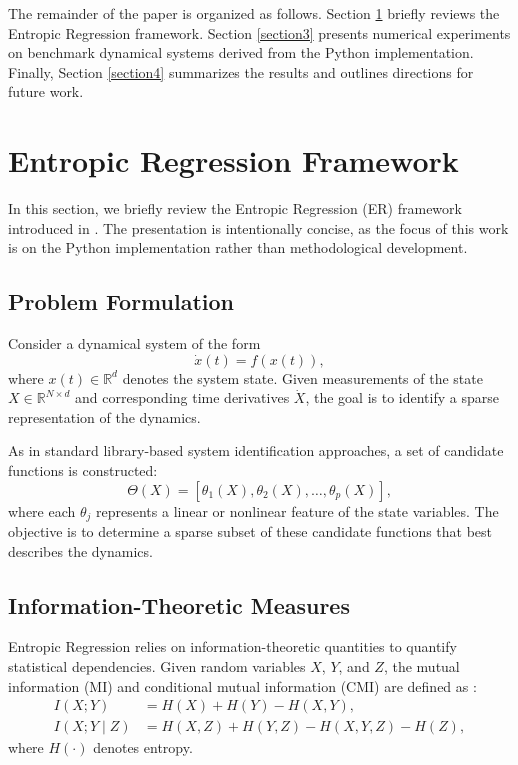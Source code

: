 \documentclass[11pt]{article}
\begin{document}
The remainder of the paper is organized as follows. Section \ref{section2} briefly reviews the Entropic Regression framework. Section \ref{section3} presents numerical experiments on benchmark dynamical systems derived from the Python implementation. Finally, Section \ref{section4} summarizes the results and outlines directions for future work.

\section{Entropic Regression Framework} \label{section2}

In this section, we briefly review the Entropic Regression (ER) framework introduced in \cite{almomani2020entropic}. The presentation is intentionally concise, as the focus of this work is on the Python implementation rather than methodological development.

\subsection{Problem Formulation}

Consider a dynamical system of the form
\begin{equation}
\dot{x}(t) = f(x(t)),
\end{equation}
where $x(t) \in \mathbb{R}^d$ denotes the system state. Given measurements of the state $X \in \mathbb{R}^{N \times d}$ and corresponding time derivatives $\dot{X}$, the goal is to identify a sparse representation of the dynamics.

As in standard library-based system identification approaches, a set of candidate functions is constructed:
\begin{equation}
\Theta(X) = [\theta_1(X), \theta_2(X), \dots, \theta_p(X)],
\end{equation}
where each $\theta_j$ represents a linear or nonlinear feature of the state variables. The objective is to determine a sparse subset of these candidate functions that best describes the dynamics.

\subsection{Information-Theoretic Measures}

Entropic Regression relies on information-theoretic quantities to quantify statistical dependencies. Given random variables $X$, $Y$, and $Z$, the mutual information (MI) and conditional mutual information (CMI) are defined as \cite{cover2006elements}:
\begin{align}
I(X;Y) &= H(X) + H(Y) - H(X,Y), \\
I(X;Y \mid Z) &= H(X,Z) + H(Y,Z) - H(X,Y,Z) - H(Z),
\end{align}
where $H(\cdot)$ denotes entropy.
\end{document}
